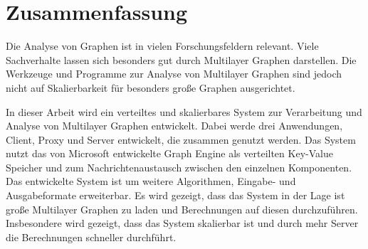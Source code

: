 
\section{Zusammenfassung}

Die Analyse von Graphen ist in vielen Forschungsfeldern relevant. Viele Sachverhalte lassen sich besonders gut durch Multilayer Graphen darstellen.
Die Werkzeuge und Programme zur Analyse von Multilayer Graphen sind jedoch nicht auf Skalierbarkeit für besonders große Graphen ausgerichtet. 

In dieser Arbeit wird ein verteiltes und skalierbares System zur Verarbeitung und Analyse von Multilayer Graphen entwickelt. 
Dabei werde drei Anwendungen, Client, Proxy und Server entwickelt, die zusammen genutzt werden. 
Das System nutzt das von Microsoft entwickelte Graph Engine als verteilten Key-Value Speicher und zum Nachrichtenaustausch zwischen den einzelnen Komponenten.
Das entwickelte System ist um weitere Algorithmen, Eingabe- und Ausgabeformate erweiterbar.
Es wird gezeigt, dass das System in der Lage ist große Multilayer Graphen zu laden und Berechnungen auf diesen durchzuführen. Insbesondere wird gezeigt, dass das System skalierbar ist und durch mehr Server die Berechnungen schneller durchführt.
